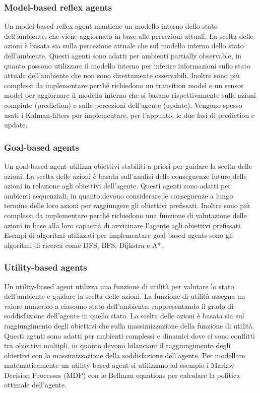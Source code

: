 \subsubsection*{Model-based reflex agents}
Un model-based reflex agent mantiene un modello interno dello stato dell'ambiente, che viene aggiornato in base alle percezioni
attuali. La scelta delle azioni è basata sia sulla percezione attuale che sul modello interno dello stato dell'ambiente. Questi
agenti sono adatti per ambienti partially observable, in quanto possono utilizzare il modello interno per inferire informazioni
sullo stato attuale dell'ambiente che non sono direttamente osservabili. Inoltre sono più complessi da implementare perché
richiedono un transition model e un sensor model per aggiornare il modello interno che si basano rispettivamente sulle azioni
compiute (prediction) e sulle percezioni dell'agente (update). Vengono spesso usati i Kalman-filters per implementare, per
l'appunto, le due fasi di prediction e update.

\subsubsection*{Goal-based agents}
Un goal-based agent utilizza obiettivi stabiliti a priori per guidare la scelta delle azioni. La scelta delle azioni è basata
sull'analisi delle conseguenze future delle azioni in relazione agli obiettivi dell'agente. Questi agenti sono adatti per
ambienti sequenziali, in quanto devono considerare le conseguenze a lungo termine delle loro azioni per raggiungere gli
obiettivi prefissati. Inoltre sono più complessi da implementare perché richiedono una funzione di valutazione delle azioni
in base alla loro capacità di avvicinare l'agente agli obiettivi prefissati. Esempi di algoritmi utilizzati per implementare
goal-based agents sono gli algoritmi di ricerca come DFS, BFS, Dijkstra e A*.

\subsubsection*{Utility-based agents}
Un utility-based agent utilizza una funzione di utilità per valutare lo stato dell'ambiente e guidare la scelta delle azioni.
La funzione di utilità assegna un valore numerico a ciascuno stato dell'ambiente, rappresentando il grado di soddisfazione
dell'agente in quello stato. La scelta delle azioni è basata sia sul raggiungimento degli obiettivi che sulla massimizzazione
della funzione di utilità. Questi agenti sono adatti per ambienti complessi e dinamici dove ci sono conflitti tra obiettivi
multipli, in quanto devono bilanciare il raggiungimento degli obiettivi con la massimizzazione della soddisfazione dell'agente.
Per modellare matematicamente un utility-based agent si utilizzano ad esempio i Markov Decision Processes (MDP) con le Bellman
equations per calcolare la politica ottimale dell'agente.

